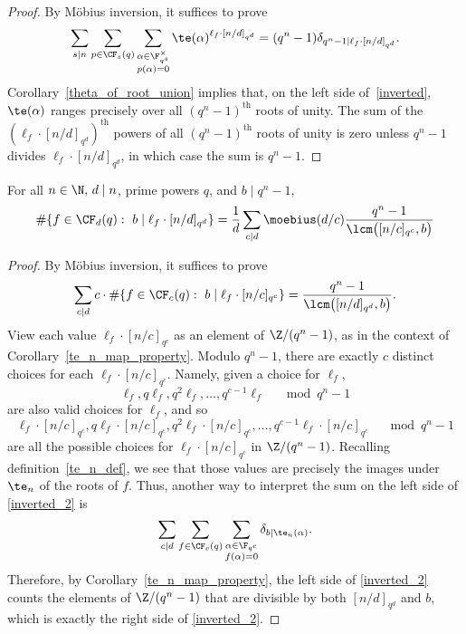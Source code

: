 \begin{proof}
By M\"obius inversion, it suffices to prove
\begin{equation}
\label{inverted}
\sum_{s \mid n}
\sum_{p \in \CF_s (q)}
\sum_{\substack{\alpha \in \F_{q^s}^\times \\ p(\alpha) = 0}}
\te (\alpha)^{\ell_f \cdot [n/d]_{q^d}}
=
(q^n - 1) \delta_{q^n - 1 \mid \ell_f \cdot [n/d]_{q^d}}.
\end{equation}
Corollary~\ref{theta_of_root_union} implies that, on the left side of~\eqref{inverted}, \(\te(\alpha)\) ranges precisely over all \((q^n-1)^\text{th}\) roots of unity.
The sum of the \((\ell_f \cdot [n/d]_{q^d})^\text{th}\) powers of all \((q^n-1)^\text{th}\) roots of unity is zero unless \(q^n-1\) divides \(\ell_f \cdot [n/d]_{q^d}\), in which case the sum is \(q^n-1\).
\end{proof}


\begin{lemma}
\label{post_pre_pre_main}
For all \(n \in \N, \, d \mid n\), prime powers \(q\), and \(b \mid q^n-1\),
\begin{equation}
\# \{f \in \CF_d (q) : \, \, b \mid \ell_f \cdot [n/d]_{q^d}\}
=
\frac{1}{d}
\sum_{c \mid d}
\moebius(d/c)
\frac{q^n-1}{\lcm \big (
[n/c]_{q^c}, b
\big )}
\end{equation}
\end{lemma}


\begin{proof}
By M\"obius inversion, it suffices to prove
\begin{equation}
\label{inverted_2}
\sum_{c \mid d} c \cdot \# \{f \in \CF_c (q) : \, \, b \mid \ell_f \cdot [n/c]_{q^c} \}
=
\frac{q^n-1}{\lcm \big (
[n/d]_{q^d}, b
\big )}.
\end{equation}
View each value \(\ell_f \cdot [n/c]_{q^c}\) as an element of \(\Z / (q^n-1)\), as in the context of Corollary~\ref{te_n_map_property}.
Modulo \(q^n-1\), there are exactly \(c\) distinct choices for each \(\ell_f \cdot [n/c]_{q^c}\).
Namely, given a choice for \(\ell_f\),
\[
\ell_f , q\ell_f , q^2\ell_f , \ldots, q^{c-1}\ell_f \quad \mod q^n-1
\]
are also valid choices for \(\ell_f\), and so
\[
\ell_f \cdot [n/c]_{q^c}, q\ell_f \cdot [n/c]_{q^c} , q^2 \ell_f \cdot [n/c]_{q^c} , \ldots, q^{c-1}\ell_f \cdot [n/c]_{q^c} \quad \mod q^n-1
\]
are all the possible choices for \(\ell_f \cdot [n/c]_{q^c}\) in \(\Z / (q^n-1)\).
Recalling definition~\eqref{te_n_def}, we see that those values are precisely the images under \(\te_n\) of the roots of \(f\).
Thus, another way to interpret the sum on the left side of \eqref{inverted_2} is
\[
\sum_{c \mid d} \sum_{f \in \CF_c (q)} \sum_{\substack{\alpha \in \F_{q^c} \\ f(\alpha) = 0}} \delta_{b \mid \te_n(\alpha)}.
\]
Therefore, by Corollary~\ref{te_n_map_property}, the left side of \eqref{inverted_2} counts the elements of \(\Z / (q^n-1)\) that are divisible by both \([n/d]_{q^d}\) and \(b\),
which is exactly the right side of \eqref{inverted_2}.
\end{proof}




